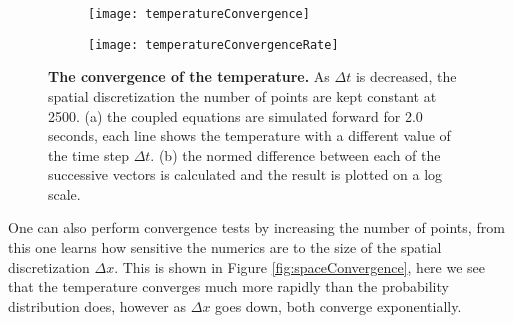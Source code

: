 \begin{figure}
	\begin{subfigure}{0.49\textwidth}
		\texttt{[image: temperatureConvergence]}
	\end{subfigure}
	\begin{subfigure}{0.49\textwidth}
		\texttt{[image: temperatureConvergenceRate]}
	\end{subfigure}
\caption{\textbf{The convergence of the temperature.} As $\Delta t$ is decreased, the spatial discretization the number of points are kept constant at 2500. (a) the coupled equations are simulated forward for 2.0 seconds, each line shows the temperature with a different value of the time step $\Delta t$. (b) the normed difference between each of the successive vectors is calculated and the result is plotted on  a log scale.}
\label{fig:temperatureConvergence}
\end{figure}

One can also perform convergence tests by increasing the number of points, from this one learns how sensitive the numerics are to the size of the spatial discretization $\Delta x$. This is shown in Figure \ref{fig:spaceConvergence}, here we see that the temperature converges much more rapidly than the probability distribution does, however as $\Delta x$ goes down, both converge exponentially.

